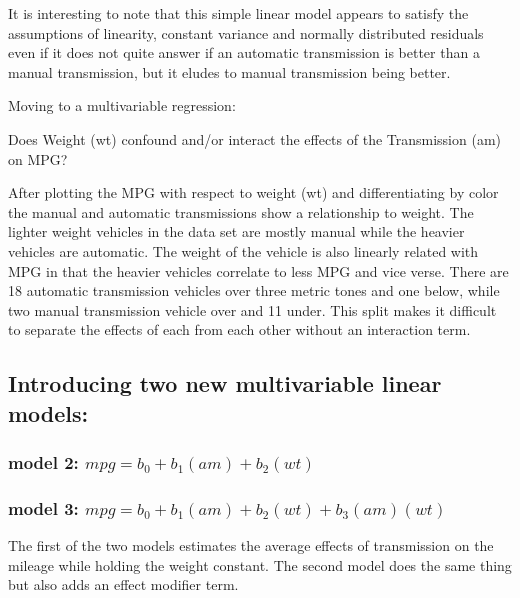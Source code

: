 \documentclass[
]{article}
\begin{document}
It is interesting to note that this simple linear model appears to
satisfy the assumptions of linearity, constant variance and normally
distributed residuals even if it does not quite answer if an automatic
transmission is better than a manual transmission, but it eludes to
manual transmission being better.

Moving to a multivariable regression:

Does Weight (wt) confound and/or interact the effects of the
Transmission (am) on MPG?

After plotting the MPG with respect to weight (wt) and differentiating
by color the manual and automatic transmissions show a relationship to
weight. The lighter weight vehicles in the data set are mostly manual
while the heavier vehicles are automatic. The weight of the vehicle is
also linearly related with MPG in that the heavier vehicles correlate to
less MPG and vice verse. There are 18 automatic transmission vehicles
over three metric tones and one below, while two manual transmission
vehicle over and 11 under. This split makes it difficult to separate the
effects of each from each other without an interaction term.

\hypertarget{introducing-two-new-multivariable-linear-models}{%
\subsection{Introducing two new multivariable linear
models:}\label{introducing-two-new-multivariable-linear-models}}

\hypertarget{model-2-mpg-b_0-b_1am-b_2wt}{%
\subsubsection{\texorpdfstring{model 2:
\(mpg = b_0 + b_1(am) + b_2(wt)\)}{model 2: mpg = b\_0 + b\_1(am) + b\_2(wt)}}\label{model-2-mpg-b_0-b_1am-b_2wt}}

\hypertarget{model-3-mpg-b_0-b_1am-b_2wt-b_3amwt}{%
\subsubsection{\texorpdfstring{model 3:
\(mpg = b_0 + b_1(am) + b_2(wt)+ b_3(am)(wt)\)}{model 3: mpg = b\_0 + b\_1(am) + b\_2(wt)+ b\_3(am)(wt)}}\label{model-3-mpg-b_0-b_1am-b_2wt-b_3amwt}}

The first of the two models estimates the average effects of
transmission on the mileage while holding the weight constant. The
second model does the same thing but also adds an effect modifier term.
\end{document}
